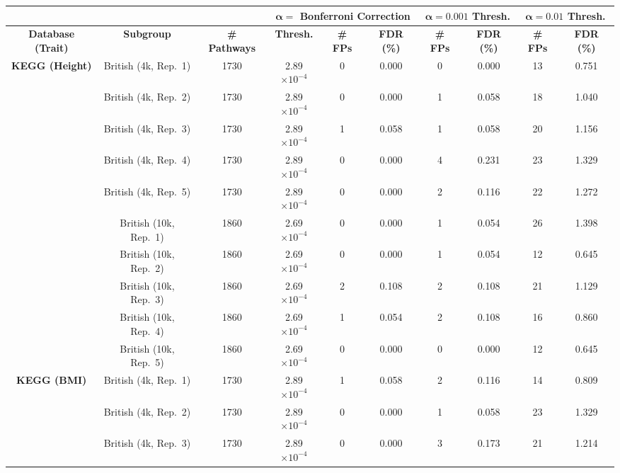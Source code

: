 \documentclass[10pt]{article}
\begin{document}
\begin{landscape}
\setlength{\extrarowheight}{3pt}
\begin{table}[ht]
\centering
\vspace*{-1.5cm}
\hspace*{-2em}
\begin{tabular}{|c|c|c|ccc|cc|cc|}
  \hline
& & & \multicolumn{3}{c|}{\textbf{$\bm{\alpha =}$ Bonferroni Correction}} & \multicolumn{2}{c|}{\textbf{$\bm{\alpha = 0.001}$ Thresh.}} & \multicolumn{2}{c|}{\textbf{$\bm{\alpha = 0.01}$ Thresh.}}\\
\hline
\textbf{Database (Trait)} & \textbf{Subgroup} & \textbf{\# Pathways} & \textbf{Thresh.} & \textbf{\# FPs} & \textbf{FDR (\%)} & \textbf{\# FPs} & \textbf{FDR (\%)} &  \textbf{\# FPs} & \textbf{FDR (\%)} \\ 
  \hline
\multirow{10.5}{*}{\textbf{KEGG (Height)}} & British (4k, Rep.~1) & 1730 & 2.89$\times 10^{-4}$ & 0 & 0.000 & 0 & 0.000 & 13 & 0.751 \\
  & British (4k, Rep.~2) & 1730 & 2.89$\times 10^{-4}$ & 0 & 0.000 & 1 & 0.058 & 18 & 1.040 \\
  & British (4k, Rep.~3) & 1730 & 2.89$\times 10^{-4}$ & 1 & 0.058 & 1 & 0.058 & 20 & 1.156 \\
  & British (4k, Rep.~4) & 1730 & 2.89$\times 10^{-4}$ & 0 & 0.000 & 4 & 0.231 & 23 & 1.329 \\
  & British (4k, Rep.~5) & 1730 & 2.89$\times 10^{-4}$ & 0 & 0.000 & 2 & 0.116 & 22 & 1.272 \\
  & British (10k, Rep.~1) & 1860 & 2.69$\times 10^{-4}$ & 0 & 0.000 & 1 & 0.054 & 26 & 1.398 \\
  & British (10k, Rep.~2) & 1860 & 2.69$\times 10^{-4}$ & 0 & 0.000 & 1 & 0.054 & 12 & 0.645 \\
  & British (10k, Rep.~3) & 1860 & 2.69$\times 10^{-4}$ & 2 & 0.108 & 2 & 0.108 & 21 & 1.129 \\
  & British (10k, Rep.~4) & 1860 & 2.69$\times 10^{-4}$ & 1 & 0.054 & 2 & 0.108 & 16 & 0.860 \\
  & British (10k, Rep.~5) & 1860 & 2.69$\times 10^{-4}$ & 0 & 0.000 & 0 & 0.000 & 12 & 0.645 \\ 
  \hline
\multirow{10.5}{*}{\textbf{KEGG (BMI)}} & British (4k, Rep.~1) & 1730 & 2.89$\times 10^{-4}$ & 1 & 0.058 & 2 & 0.116 & 14 & 0.809 \\
  & British (4k, Rep.~2) & 1730 & 2.89$\times 10^{-4}$ & 0 & 0.000 & 1 & 0.058 & 23 & 1.329 \\
  & British (4k, Rep.~3) & 1730 & 2.89$\times 10^{-4}$ & 0 & 0.000 & 3 & 0.173 & 21 & 1.214 \\

\end{tabular}
\end{table}
\end{landscape}
\end{document}
